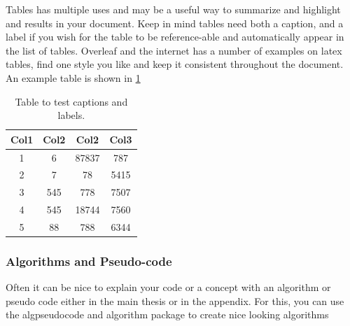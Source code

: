 Tables has multiple uses and may be a useful way to summarize and highlight and results in your document. Keep in mind tables need both a caption, and a label if you wish for the table to be reference-able and automatically appear in the list of tables. Overleaf and the internet has a number of examples on latex tables, find one style you like and keep it consistent throughout the document. An example table is shown in \ref{table:example table}

\begin{table}[!ht] %
\centering  %
\begin{tabular}{|c c c c|} %
 \hline %
 Col1 & Col2 & Col2 & Col3 \\ [0.5ex] %
 \hline\hline %
 1 & 6 & 87837 & 787 \\ %
 2 & 7 & 78 & 5415 \\
 3 & 545 & 778 & 7507 \\
 4 & 545 & 18744 & 7560 \\
 5 & 88 & 788 & 6344 \\ [1ex] 
 \hline  %
\end{tabular}
\caption{Table to test captions and labels.} %
\label{table:example table} %
\end{table}

\subsubsection{Algorithms and Pseudo-code}

Often it can be nice to explain your code or a concept with an algorithm or pseudo code either in the main thesis or in the appendix. For this, you can use the algpseudocode and algorithm package to create nice looking algorithms

